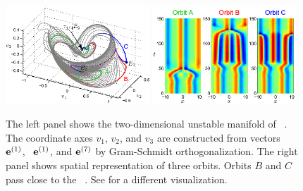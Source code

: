 \begin{figure}[h!t]
\begin{center}
 \includegraphics[width=0.48\textwidth]{../figs/ks22_E2_manifold_c}
 \includegraphics[width=0.48\textwidth]{../figs/ks22_E2_orbits_c}
\end{center}
\caption[Unstable manifold of \eqv\ ]{
The left panel shows the two-dimensional
unstable manifold of \eqv\ . The coordinate axes
$v_1$, $v_2$, and $v_3$ are constructed from vectors
\Re\, ${\mathbf e}^{(1)}$, \Im\, ${\mathbf e}^{(1)}$, and ${\mathbf e}^{(7)}$
by Gram-Schmidt orthogonalization.
The right panel shows spatial representation of three orbits. Orbits
$B$ and $C$ pass close to the \eqv\ . See
 for a different visualization.
       }
\label{f:KS22E2man}
\end{figure}


